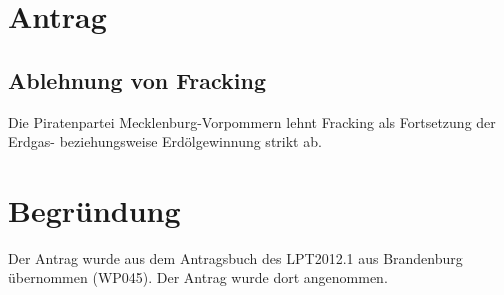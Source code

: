 \section{Antrag}

\subsection{Ablehnung von Fracking}

Die Piratenpartei Mecklenburg-Vorpommern lehnt Fracking als Fortsetzung der Erdgas- beziehungsweise Erdölgewinnung strikt ab.

\section{Begründung}

Der Antrag wurde aus dem Antragsbuch des LPT2012.1 aus Brandenburg übernommen (WP045). Der Antrag wurde dort angenommen.
